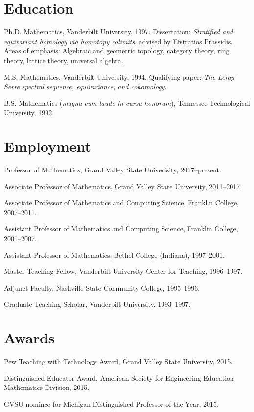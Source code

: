 \documentclass[letterpaper]{article}
\renewenvironment{itemize}{
  \begin{list}{}{
    \setlength{\leftmargin}{1.5em}
	\setlength{\itemsep}{0in}
  }
}{
  \end{list}
}
\begin{document}
\section*{Education}

\begin{itemize}
  \item Ph.D. Mathematics, Vanderbilt University, 1997. Dissertation: \emph{Stratified and equivariant homology via homotopy colimits}, advised by Efstratios Prassidis. Areas of emphasis: Algebraic and geometric topology, category theory, ring theory, lattice theory, universal algebra.


  \item M.S. Mathematics, Vanderbilt University, 1994. Qualifying paper: \emph{The Leray-Serre spectral sequence, equivariance, and cohomology}.

  \item B.S. Mathematics (\emph{magna cum laude in cursu honorum}), Tennessee Technological University, 1992.

\end{itemize}

\section*{Employment}

\begin{itemize}
\item Professor of Mathematics, Grand Valley State Univerisity, 2017--present. 
\item Associate Professor of Mathematics, Grand Valley State University, 2011--2017.
\item Associate Professor of Mathematics and Computing Science, Franklin College, 2007--2011.
\item Assistant Professor of Mathematics and Computing Science, Franklin College, 2001--2007.
\item Assistant Professor of Mathematics, Bethel College (Indiana), 1997--2001.
\item Master Teaching Fellow, Vanderbilt University Center for Teaching, 1996--1997.
\item Adjunct Faculty, Nashville State Community College, 1995--1996.
\item Graduate Teaching Scholar, Vanderbilt University, 1993--1997.
\end{itemize}


\section*{Awards}
\begin{itemize}
	\item Pew Teaching with Technology Award, Grand Valley State University, 2015.
	\item Distinguished Educator Award, American Society for Engineering Education Mathematics Division, 2015.
	\item GVSU nominee for Michigan Distinguished Professor of the Year, 2015.
\end{itemize}
\end{document}
